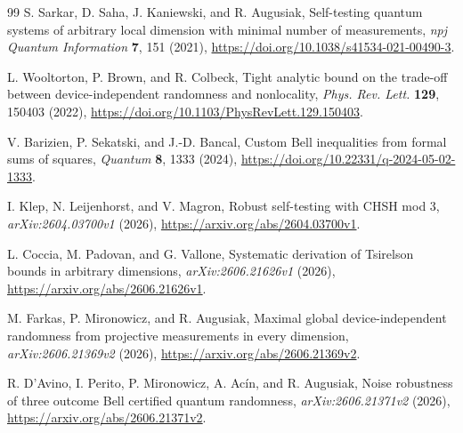\documentclass[11pt]{article}
\theoremstyle{definition}
\theoremstyle{remark}
\begin{document}
\begin{thebibliography}{99}
S. Sarkar, D. Saha, J. Kaniewski, and R. Augusiak,
\newblock Self-testing quantum systems of arbitrary local dimension with
minimal number of measurements,
\newblock \emph{npj Quantum Information} \textbf{7}, 151 (2021),
\newblock \url{https://doi.org/10.1038/s41534-021-00490-3}.

L. Wooltorton, P. Brown, and R. Colbeck,
\newblock Tight analytic bound on the trade-off between device-independent
randomness and nonlocality,
\newblock \emph{Phys. Rev. Lett.} \textbf{129}, 150403 (2022),
\newblock \url{https://doi.org/10.1103/PhysRevLett.129.150403}.

V. Barizien, P. Sekatski, and J.-D. Bancal,
\newblock Custom Bell inequalities from formal sums of squares,
\newblock \emph{Quantum} \textbf{8}, 1333 (2024),
\newblock \url{https://doi.org/10.22331/q-2024-05-02-1333}.

I. Klep, N. Leijenhorst, and V. Magron,
\newblock Robust self-testing with CHSH mod 3,
\newblock \emph{arXiv:2604.03700v1} (2026),
\newblock \url{https://arxiv.org/abs/2604.03700v1}.

L. Coccia, M. Padovan, and G. Vallone,
\newblock Systematic derivation of Tsirelson bounds in arbitrary dimensions,
\newblock \emph{arXiv:2606.21626v1} (2026),
\newblock \url{https://arxiv.org/abs/2606.21626v1}.

M. Farkas, P. Mironowicz, and R. Augusiak,
\newblock Maximal global device-independent randomness from projective
measurements in every dimension,
\newblock \emph{arXiv:2606.21369v2} (2026),
\newblock \url{https://arxiv.org/abs/2606.21369v2}.

R. D'Avino, I. Perito, P. Mironowicz, A. Ac\'in, and R. Augusiak,
\newblock Noise robustness of three outcome Bell certified quantum randomness,
\newblock \emph{arXiv:2606.21371v2} (2026),
\newblock \url{https://arxiv.org/abs/2606.21371v2}.

\end{thebibliography}
\end{document}
